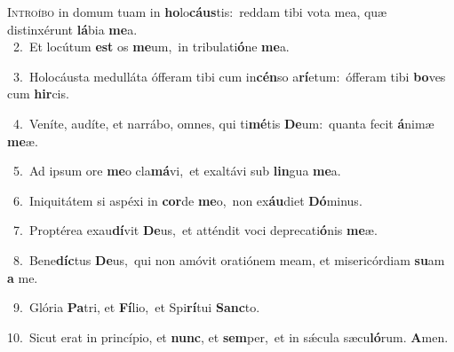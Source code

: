 \lettrine{\initial\textcolor{\initialcolor}{I}}{ntroíbo} in domum tuam in \textbf{ho}\-lo\-\textbf{cáus}\-tis:~\star reddam tibi vota mea, quæ distinxérunt \textbf{lá}\-bia \textbf{me}\-a.\\
{\numbfont\textcolor{\numbcolor}{~2.}}~Et locútum \textbf{est} os \textbf{me}\-um,~\star in tribulati\-\textbf{ó}\-ne \textbf{me}\-a.\par
{\numbfont\textcolor{\numbcolor}{~3.}}~Holocáusta medulláta ófferam tibi cum in\-\textbf{cén}\-so a\-\textbf{rí}\-etum:~\star ófferam tibi \textbf{bo}\-ves cum \textbf{hir}\-cis.\par
{\numbfont\textcolor{\numbcolor}{~4.}}~Veníte, audíte, et narrábo, omnes, qui ti\-\textbf{mé}\-tis \textbf{De}\-um:~\star quanta fecit \textbf{á}\-nimæ \textbf{me}\-æ.\par
{\numbfont\textcolor{\numbcolor}{~5.}}~Ad ipsum ore \textbf{me}\-o cla\-\textbf{má}\-vi,~\star et exaltávi sub \textbf{lin}\-gua \textbf{me}\-a.\par
{\numbfont\textcolor{\numbcolor}{~6.}}~Iniquitátem si aspéxi in \textbf{cor}\-de \textbf{me}\-o,~\star non ex\-\textbf{áu}\-diet \textbf{Dó}\-minus.\par
{\numbfont\textcolor{\numbcolor}{~7.}}~Proptérea exau\-\textbf{dí}\-vit \textbf{De}\-us,~\star et atténdit voci deprecati\-\textbf{ó}\-nis \textbf{me}\-æ.\par
{\numbfont\textcolor{\numbcolor}{~8.}}~Bene\-\textbf{díc}\-tus \textbf{De}\-us,~\star qui non amóvit oratiónem meam, et misericórdiam \textbf{su}\-am \textbf{a} me.\par
{\numbfont\textcolor{\numbcolor}{~9.}}~Glória \textbf{Pa}\-tri, et \textbf{Fí}\-lio,~\star et Spi\-\textbf{rí}\-tui \textbf{Sanc}\-to.\par
{\numbfont\textcolor{\numbcolor}{10.}}~Sicut erat in princípio, et \textbf{nunc}\-, et \textbf{sem}\-per,~\star et in sǽcula sæcu\-\textbf{ló}\-rum. \textbf{A}\-men.\par
